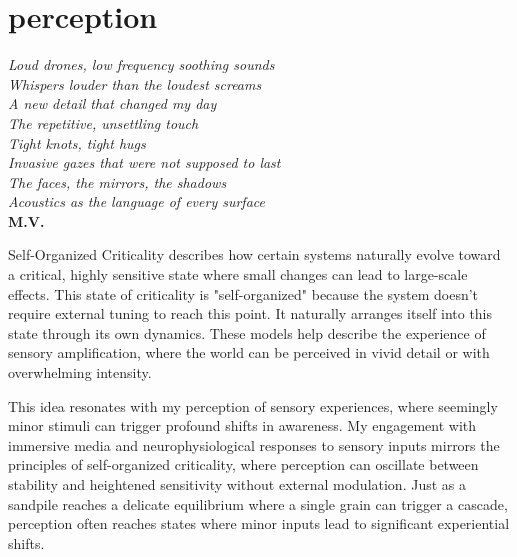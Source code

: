 \chapter*{perception}
\begin{center}
\vspace{2cm}
\begin{flushright}
\textit{Loud drones, low frequency soothing sounds\\Whispers louder than the loudest screams\\A new detail that changed my day\\The repetitive, unsettling touch\\Tight knots, tight hugs\\Invasive gazes that were not supposed to last\\The faces, the mirrors, the shadows\\Acoustics as the language of every surface}\\
\textbf{M.V.} 
\end{flushright}
\vspace{2cm}
\end{center}
\normalsize

\newpage 
Self-Organized Criticality describes how certain systems naturally evolve toward a critical, highly sensitive state where small changes can lead to large-scale effects. This state of criticality is "self-organized" because the system doesn't require external tuning to reach this point. It naturally arranges itself into this state through its own dynamics. These models help describe the experience of sensory amplification, where the world can be perceived in vivid detail or with overwhelming intensity. \citep{adami1993}

This idea resonates with my perception of sensory experiences, where seemingly minor stimuli can trigger profound shifts in awareness. My engagement with immersive media and neurophysiological responses to sensory inputs mirrors the principles of self-organized criticality, where perception can oscillate between stability and heightened sensitivity without external modulation. Just as a sandpile reaches a delicate equilibrium where a single grain can trigger a cascade, perception often reaches states where minor inputs lead to significant experiential shifts.

